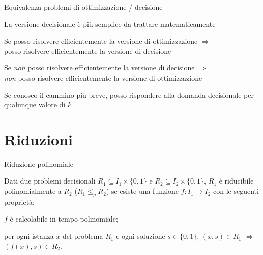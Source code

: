 \begin{frame}{Equivalenza problemi di ottimizzazione / decisione}

\vspace{-9pt}
\BIL
\item La versione decisionale è più semplice da trattare matematicamente
\item Se posso risolvere efficientemente la versione di ottimizzazione
$\Rightarrow$ \\ posso risolvere efficientemente la versione di decisione 
\item \alert{Se \emph{non} posso risolvere efficientemente la versione di decisione
$\Rightarrow$ \\ \emph{non} posso risolvere efficientemente la versione di ottimizzazione}
\EIL

\begin{myboxtitle}
\BIL
\item Se conosco il cammino più breve, posso rispondere alla domanda decisionale
per qualunque valore di $k$
\EIL
\end{myboxtitle}


\end{frame}

\section{Riduzioni}

\begin{frame}{Riduzione polinomiale}

\vspace{-9pt}
\begin{myboxtitle}
Dati due problemi decisionali $R_1 \subseteq I_1 \times \{ 0,1 \}$ e
$R_2 \subseteq I_2 \times \{ 0,1 \}$, $R_1$ è \alert{riducibile polinomialmente} a $R_2$ (\alert{$R_1 \leq_p R_2$}) se esiste una funzione
$f: I_1 \rightarrow I_2$ con le seguenti proprietà:
\BI
\item $f$ è calcolabile in tempo polinomiale;
\item per ogni istanza $x$ del problema $R_1$ e
  ogni soluzione $s \in \{ 0,1 \}$, 
  $(x,s) \in R_1$ $\Leftrightarrow$ $(f(x),s) \in R_2$.
\EI
\end{myboxtitle}


\end{frame}

